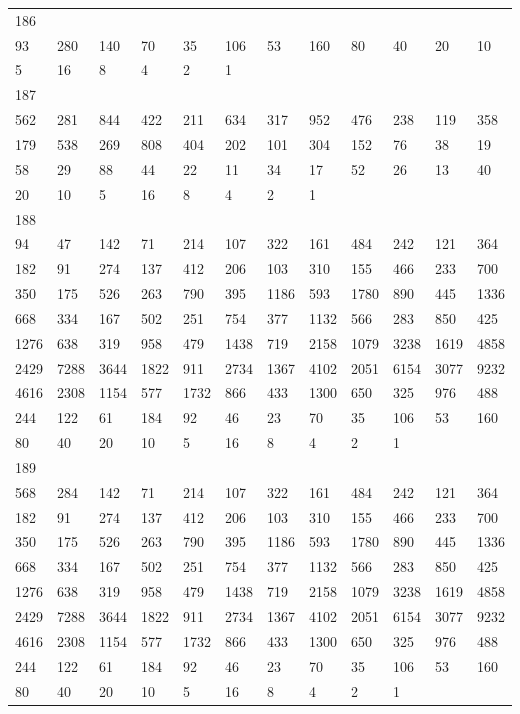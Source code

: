 \begin{longtable}{llllllllllll}
186&&&&&&&&&&&\\
93& 280& 140& 70& 35& 106& 53& 160& 80& 40& 20& 10\\
5& 16& 8& 4& 2& 1& \\

187&&&&&&&&&&&\\
562& 281& 844& 422& 211& 634& 317& 952& 476& 238& 119& 358\\
179& 538& 269& 808& 404& 202& 101& 304& 152& 76& 38& 19\\
58& 29& 88& 44& 22& 11& 34& 17& 52& 26& 13& 40\\
20& 10& 5& 16& 8& 4& 2& 1& \\

188&&&&&&&&&&&\\
94& 47& 142& 71& 214& 107& 322& 161& 484& 242& 121& 364\\
182& 91& 274& 137& 412& 206& 103& 310& 155& 466& 233& 700\\
350& 175& 526& 263& 790& 395& 1186& 593& 1780& 890& 445& 1336\\
668& 334& 167& 502& 251& 754& 377& 1132& 566& 283& 850& 425\\
1276& 638& 319& 958& 479& 1438& 719& 2158& 1079& 3238& 1619& 4858\\
2429& 7288& 3644& 1822& 911& 2734& 1367& 4102& 2051& 6154& 3077& 9232\\
4616& 2308& 1154& 577& 1732& 866& 433& 1300& 650& 325& 976& 488\\
244& 122& 61& 184& 92& 46& 23& 70& 35& 106& 53& 160\\
80& 40& 20& 10& 5& 16& 8& 4& 2& 1& \\

189&&&&&&&&&&&\\
568& 284& 142& 71& 214& 107& 322& 161& 484& 242& 121& 364\\
182& 91& 274& 137& 412& 206& 103& 310& 155& 466& 233& 700\\
350& 175& 526& 263& 790& 395& 1186& 593& 1780& 890& 445& 1336\\
668& 334& 167& 502& 251& 754& 377& 1132& 566& 283& 850& 425\\
1276& 638& 319& 958& 479& 1438& 719& 2158& 1079& 3238& 1619& 4858\\
2429& 7288& 3644& 1822& 911& 2734& 1367& 4102& 2051& 6154& 3077& 9232\\
4616& 2308& 1154& 577& 1732& 866& 433& 1300& 650& 325& 976& 488\\
244& 122& 61& 184& 92& 46& 23& 70& 35& 106& 53& 160\\
80& 40& 20& 10& 5& 16& 8& 4& 2& 1& \\


\end{longtable}

